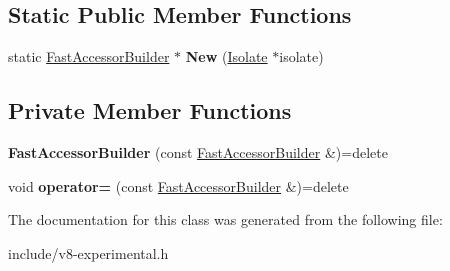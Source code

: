 \subsection*{Static Public Member Functions}
\begin{DoxyCompactItemize}
\item 
static \hyperlink{classv8_1_1experimental_1_1_fast_accessor_builder}{Fast\+Accessor\+Builder} $\ast$ {\bfseries New} (\hyperlink{classv8_1_1_isolate}{Isolate} $\ast$isolate)\hypertarget{classv8_1_1experimental_1_1_fast_accessor_builder_a2e0a7009b83376ae2f45b78159cd392c}{}\label{classv8_1_1experimental_1_1_fast_accessor_builder_a2e0a7009b83376ae2f45b78159cd392c}

\end{DoxyCompactItemize}
\subsection*{Private Member Functions}
\begin{DoxyCompactItemize}
\item 
{\bfseries Fast\+Accessor\+Builder} (const \hyperlink{classv8_1_1experimental_1_1_fast_accessor_builder}{Fast\+Accessor\+Builder} \&)=delete\hypertarget{classv8_1_1experimental_1_1_fast_accessor_builder_aad57de2056ac00fc77a8b9c5d9ff9951}{}\label{classv8_1_1experimental_1_1_fast_accessor_builder_aad57de2056ac00fc77a8b9c5d9ff9951}

\item 
void {\bfseries operator=} (const \hyperlink{classv8_1_1experimental_1_1_fast_accessor_builder}{Fast\+Accessor\+Builder} \&)=delete\hypertarget{classv8_1_1experimental_1_1_fast_accessor_builder_a9293ec9344bae9e233b9155651458f8c}{}\label{classv8_1_1experimental_1_1_fast_accessor_builder_a9293ec9344bae9e233b9155651458f8c}

\end{DoxyCompactItemize}


The documentation for this class was generated from the following file\+:\begin{DoxyCompactItemize}
\item 
include/v8-\/experimental.\+h\end{DoxyCompactItemize}
